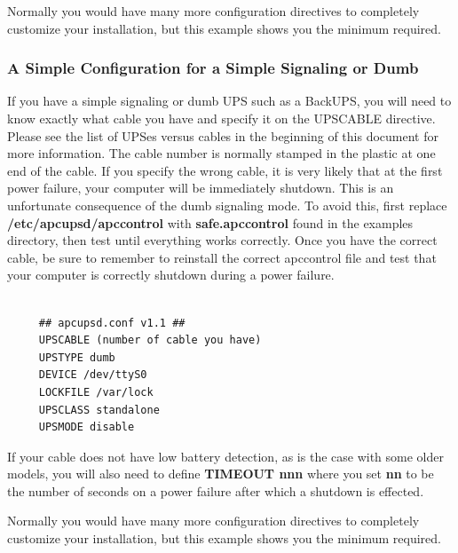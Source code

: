 Normally you would have many more configuration directives to completely
customize your installation, but this example shows you the minimum required. 

\label{A-Simple-Configuration-for-a-Simple-Signaling-or-Dumb}

\subsubsection*{A Simple Configuration for a Simple Signaling or Dumb}

\label{index-Configuration_002c-dumb-71}
\label{index-dumb_002c-configuration-72}
\label{index-Example_002c-dumb-conf-73}
If you have a simple signaling or dumb UPS such as a BackUPS, you will need to
know exactly what cable you have and specify it on the UPSCABLE directive.
Please see the list of UPSes versus cables in the beginning of this document
for more information. The cable number is normally stamped in the plastic at
one end of the cable. If you specify the wrong cable, it is very likely that
at the first power failure, your computer will be immediately shutdown. This
is an unfortunate consequence of the dumb signaling mode.  To avoid this,
first replace {\bf /etc/apcupsd/apccontrol} with {\bf safe.apccontrol} found
in the examples directory, then test until everything works correctly. Once
you have the correct cable, be sure to remember to reinstall the correct
apccontrol file and test that your computer is correctly shutdown during a
power failure. 

\footnotesize
\begin{verbatim}
     
     ## apcupsd.conf v1.1 ##
     UPSCABLE (number of cable you have)
     UPSTYPE dumb
     DEVICE /dev/ttyS0
     LOCKFILE /var/lock
     UPSCLASS standalone
     UPSMODE disable
\end{verbatim}
\normalsize

If your cable does not have low battery detection, as is the case with some
older models, you will also need to define {\bf TIMEOUT nnn} where you set
{\bf nn} to be the number of seconds on a power failure after which a shutdown
is effected.  

Normally you would have many more configuration directives to completely
customize your installation, but this example shows you the minimum required. 


